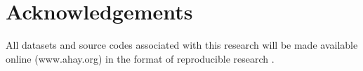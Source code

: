 \section{Acknowledgements}
All datasets and source codes associated with this research will be made available online (www.ahay.org) in the format of reproducible research \cite{mada2013}.














